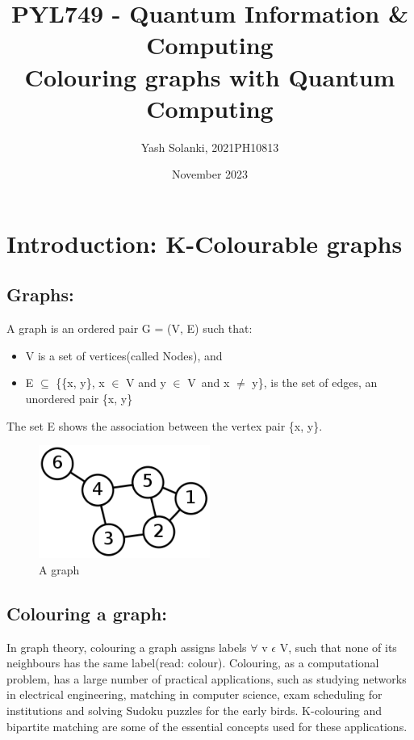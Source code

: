 \documentclass{article}
\title{
PYL749 - Quantum Information \& Computing \\ 
Colouring graphs with Quantum Computing
}
\author{Yash Solanki, 2021PH10813}
\date{November 2023}
\begin{document}
\maketitle

\section{Introduction: K-Colourable graphs}

\subsection{Graphs:}

A graph is an ordered pair G = (V, E) such that: 
\begin{itemize}
    \item V is a set of vertices(called Nodes), and 
    \item E $\subseteq$ \{\{x, y\}, x $\in$ V and y $\in$ V\ and x $\neq$ y\}, is the set of edges, an unordered pair \{x, y\}
\end{itemize}
The set E shows the 
association between the vertex pair \{x, y\}. 
\begin{figure}[h]
  \centering
\includegraphics[width=0.5\textwidth]{graph1.png}
  \caption{A graph}
  \label{fig:A graph}
\end{figure}

\subsection{Colouring a graph:}

In graph theory, colouring a graph assigns labels $\forall$ v $\epsilon$ V, such that none of its neighbours has the same label(read: colour). Colouring, as a computational problem, has a large number of practical applications, such as studying networks in electrical engineering, matching in computer science, exam scheduling for institutions and solving Sudoku puzzles for the early birds. K-colouring and bipartite matching are some of the essential concepts used for these applications. 
\end{document}
